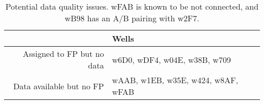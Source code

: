 \begin{table}[ht]
\centering
\begin{tabular}{rl}
  \hline
 & Wells \\ 
  \hline
Assigned to FP but no data & w6D0, wDF4, w04E, w38B, w709 \\ 
  Data available but no FP & wAAB, w1EB, w35E, w424, w8AF, wFAB \\ 
   \hline
\end{tabular}
\caption{Potential data quality issues. wFAB is known to be not connected, and wB98 has an A/B pairing with w2F7.} 
\label{tab:quality}
\end{table}
